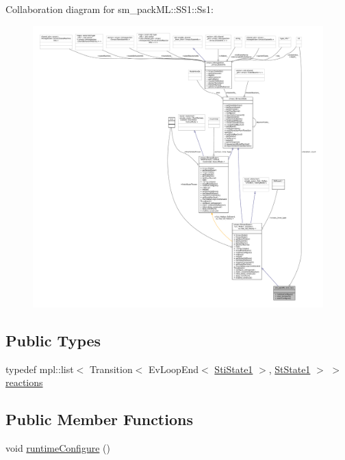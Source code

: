Collaboration diagram for sm\+\_\+pack\+ML\+:\+:S\+S1\+:\+:Ss1\+:
\nopagebreak
\begin{figure}[H]
\begin{center}
\leavevmode
\includegraphics[width=350pt]{structsm__packML_1_1SS1_1_1Ss1__coll__graph}
\end{center}
\end{figure}
\subsection*{Public Types}
\begin{DoxyCompactItemize}
\item 
typedef mpl\+::list$<$ Transition$<$ Ev\+Loop\+End$<$ \hyperlink{structsm__packML_1_1ss1__states_1_1StiState1}{Sti\+State1} $>$, \hyperlink{structsm__packML_1_1StState1}{St\+State1} $>$ $>$ \hyperlink{structsm__packML_1_1SS1_1_1Ss1_af899976915a8923aa41bc182736857bd}{reactions}
\end{DoxyCompactItemize}
\subsection*{Public Member Functions}
\begin{DoxyCompactItemize}
\item 
void \hyperlink{structsm__packML_1_1SS1_1_1Ss1_a6dbc02368ee5b089dbaa608b8de4e861}{runtime\+Configure} ()
\end{DoxyCompactItemize}
